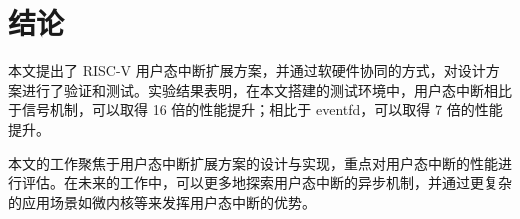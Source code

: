 
\chapter{结论}

本文提出了 RISC-V 用户态中断扩展方案，并通过软硬件协同的方式，对设计方案进行了验证和测试。实验结果表明，在本文搭建的测试环境中，用户态中断相比于信号机制，可以取得 16 倍的性能提升；相比于 eventfd，可以取得 7 倍的性能提升。

本文的工作聚焦于用户态中断扩展方案的设计与实现，重点对用户态中断的性能进行评估。在未来的工作中，可以更多地探索用户态中断的异步机制，并通过更复杂的应用场景如微内核等来发挥用户态中断的优势。